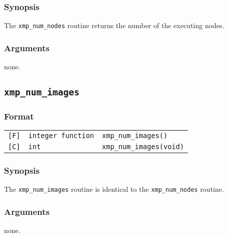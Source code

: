 \subsubsection*{Synopsis}
The {\tt xmp\_num\_nodes} routine returns the number of the executing nodes.

\subsubsection*{Arguments}
none.

\subsection{\tt xmp\_num\_images}\label{sub:xmpnumimages}

\subsubsection*{Format}

\begin{tabular}{lll}
\verb![F]!&  {\tt integer function}& {\tt xmp\_num\_images()}\\
\verb![C]!&  {\tt int}& {\tt xmp\_num\_images(void)}
\end{tabular}

\subsubsection*{Synopsis}
The {\tt xmp\_num\_images} routine is identical to the {\tt xmp\_num\_nodes} routine.

\subsubsection*{Arguments}
none.

%
%
%
%
%

